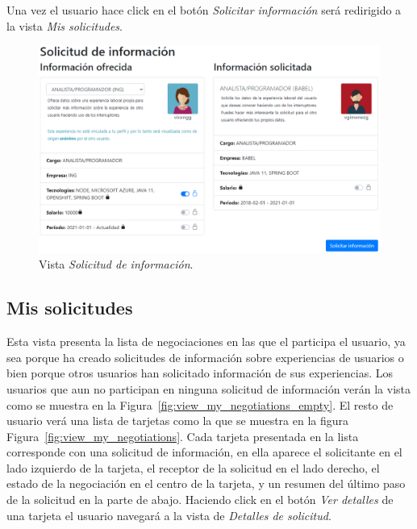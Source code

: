 \documentclass[a4paper, 12pt]{book}
\begin{document}
    Una vez el usuario hace click en el botón \emph{Solicitar información} será redirigido a la vista \emph{Mis solicitudes}.

    \begin{figure}
        \centering
        \includegraphics[width=15cm, keepaspectratio]{img/negotiate_we.PNG}
        \caption{Vista \emph{Solicitud de información}.}\label{fig:view_create_negotiation}
    \end{figure}

    \subsection{Mis solicitudes}
    \label{subsec:view_my_negotiations}
    Esta vista presenta la lista de negociaciones en las que el participa el usuario, ya sea porque ha creado solicitudes de información sobre experiencias de usuarios o bien porque otros usuarios han solicitado información de sus experiencias.
    Los usuarios que aun no participan en ninguna solicitud de información verán la vista como se muestra en la Figura~\ref{fig:view_my_negotiations_empty}.
    El resto de usuario verá una lista de tarjetas como la que se muestra en la figura Figura~\ref{fig:view_my_negotiations}.
    Cada tarjeta presentada en la lista corresponde con una solicitud de información, en ella aparece el solicitante en el lado izquierdo de la tarjeta, el receptor de la solicitud en el lado derecho, el estado de la negociación en el centro de la tarjeta, y un resumen del último paso de la solicitud en la parte de abajo.
    Haciendo click en el botón \emph{Ver detalles} de una tarjeta el usuario navegará a la vista de \emph{Detalles de solicitud}.
\end{document}

